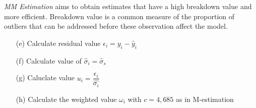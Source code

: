 \emph{MM Estimation} aims to obtain estimates that have a high breakdown value and more efficient. 
Breakdown value is a common measure of the proportion of outliers that can be 
addressed before these observation affect the model.\\

\begin{enumerate}
	\item[(e)] Calculate residual value $\epsilon_{i}=y_{i}-\hat{y}_{i}$ 
	\item[(f)] Calculate value of $\hat{\sigma}_{i}=\hat{\sigma}_{s}$
	\item[(g)] Caluclate value $u_{i}=\dfrac{\epsilon_{i}}{\hat{\sigma_{i}}}$
	\item[(h)] Calculate the weighted value $\omega_{i}$ with $c=4,685$ as in
		M-estimation
\end{enumerate}

